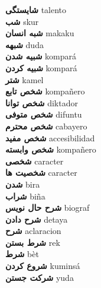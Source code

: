 \textbf{ شایستگی  } talento \\
\textbf{ شب  } skur \\
\textbf{ شبه انسان  } makaku \\
\textbf{ شبهه  } duda \\
\textbf{ شبیه شدن  } kompará \\
\textbf{ شبیه کردن  } kompará \\
\textbf{ شتر  } kamel \\
\textbf{ شخص تابع  } kompañero \\
\textbf{ شخص توانا  } diktador \\
\textbf{ شخص متوفی  } difuntu \\
\textbf{ شخص محترم  } cabayero \\
\textbf{ شخص مفید  } accesibilidad \\
\textbf{ شخص وابسته  } kompañero \\
\textbf{ شخصی  } caracter \\
\textbf{ شخصیت ها  } caracter \\
\textbf{ شدن  } bira \\
\textbf{ شراب  } biña \\
\textbf{ شرح حال نویس  } biograf \\
\textbf{ شرح دادن  } detaya \\
\textbf{ شرح  } aclaracion \\
\textbf{ شرط بستن  } rek \\
\textbf{ شرط  } bèt \\
\textbf{ شروع کردن  } kuminsá \\
\textbf{ شرکت جستن  } yuda \\
